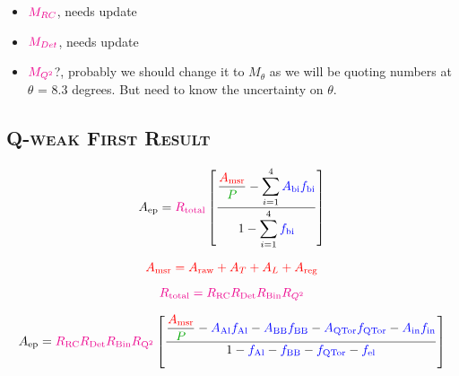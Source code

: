 \documentclass[xcolor=x11names,compress,8pt]{beamer}
\renewcommand{\(}{\begin{columns}}
\renewcommand{\)}{\end{columns}}
\newcommand{\<}[1]{\begin{column}{#1}}
\renewcommand{\>}{\end{column}}
\begin{document}
\begin{frame}
\begin{itemize}
\item 
$\textcolor{magenta}{M_{RC}}$, needs update

\item 
$\textcolor{magenta}{M_{Det}}$, needs update

\item 
$\textcolor{magenta}{M_{Q^{2}}}$?, probably we should change it to $M_{\theta}$ as we will be quoting numbers at $\theta$ = 8.3 degrees. But need to know the uncertainty on $\theta$. 

\end{itemize}




\end{frame}
%

\subsection{\scshape Q-weak First Result}
\begin{frame}


\begin{equation} \label{equ:eqPhysicsAsymmetry211}
\textcolor{black}{A_{\rm ep}} = \textcolor{magenta}{R_{\rm total}} \left[ \frac{\displaystyle\frac{\textcolor{red}{A_{\rm msr}}}{\textcolor{darkgreen}{P}} - \displaystyle\sum_{i=1}^{4} \textcolor{blue}{A_{\rm bi}f_{\rm bi}} }{1 - \displaystyle\sum_{i=1}^{4}\textcolor{blue}{f_{\rm bi}}} \right] 
\end{equation}


\begin{equation} \label{equ:eqPhysicsAsymmetry211}
\textcolor{red}{A_{\rm msr} = A_{\rm raw} + A_{T} + A_{L} + A_{\rm reg} }
\end{equation}

\begin{equation} \label{equ:eqPhysicsAsymmetry211}
\textcolor{magenta}{R_{\rm total} = R_{\rm RC}R_{\rm Det}R_{\rm Bin}R_{Q^{2}} }
\end{equation}


\begin{equation} \label{equ:eqPhysicsAsymmetry211}
\textcolor{black}{A_{\rm ep}} = \textcolor{magenta}{R_{\rm RC}R_{\rm Det}R_{\rm Bin}R_{\rm Q^{2}}} \left[ \frac{\displaystyle\frac{\textcolor{red}{A_{\rm msr}}}{\textcolor{darkgreen}{P}} - \textcolor{blue}{A_{\rm Al}f_{\rm Al}} - \textcolor{blue}{A_{\rm BB}f_{\rm BB}} - \textcolor{blue}{A_{\rm QTor}f_{\rm QTor}} - \textcolor{blue}{A_{\rm in}f_{\rm in}} }{1 - \textcolor{blue}{f_{\rm Al}} - \textcolor{blue}{f_{\rm BB}} - \textcolor{blue}{f_{\rm QTor}} - \textcolor{blue}{f_{\rm el}} } \right] 
\end{equation}

\end{frame}
\end{document}
